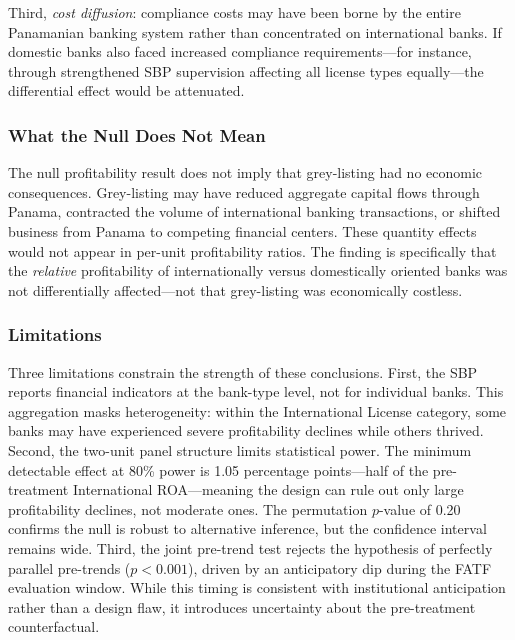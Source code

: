 \documentclass[12pt]{article}
\begin{document}
Third, \textit{cost diffusion}: compliance costs may have been borne by the entire Panamanian banking system rather than concentrated on international banks. If domestic banks also faced increased compliance requirements---for instance, through strengthened SBP supervision affecting all license types equally---the differential effect would be attenuated.

\subsubsection*{What the Null Does Not Mean}
The null profitability result does not imply that grey-listing had no economic consequences. Grey-listing may have reduced aggregate capital flows through Panama, contracted the volume of international banking transactions, or shifted business from Panama to competing financial centers. These quantity effects would not appear in per-unit profitability ratios. The finding is specifically that the \textit{relative} profitability of internationally versus domestically oriented banks was not differentially affected---not that grey-listing was economically costless.

\subsubsection*{Limitations}
Three limitations constrain the strength of these conclusions. First, the SBP reports financial indicators at the bank-type level, not for individual banks. This aggregation masks heterogeneity: within the International License category, some banks may have experienced severe profitability declines while others thrived. Second, the two-unit panel structure limits statistical power. The minimum detectable effect at 80\% power is 1.05 percentage points---half of the pre-treatment International ROA---meaning the design can rule out only large profitability declines, not moderate ones. The permutation $p$-value of 0.20 confirms the null is robust to alternative inference, but the confidence interval remains wide. Third, the joint pre-trend test rejects the hypothesis of perfectly parallel pre-trends ($p < 0.001$), driven by an anticipatory dip during the FATF evaluation window. While this timing is consistent with institutional anticipation rather than a design flaw, it introduces uncertainty about the pre-treatment counterfactual.
\end{document}
